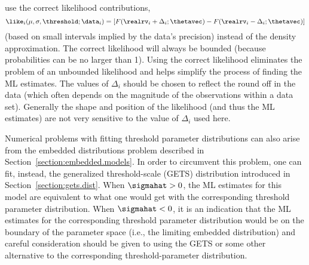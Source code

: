 use the correct likelihood contributions, 
\begin{equation}
\like_{i}(\mu, \sigma,\threshold;\data_{i})
=[F(\realrv_{i}+\Delta_{i};\thetavec)-
        F(\realrv_{i}-\Delta_{i};\thetavec)]
\label{equation:threshold.interval.likelihood}
\end{equation}
(based on small intervals implied by the data's precision) instead of
the density approximation.  The correct likelihood will always be
bounded (because probabilities can be no larger than 1). Using the correct
likelihood eliminates the problem of an unbounded likelihood and helps
simplify the
process of finding the ML estimates. The values
of $\Delta_{i}$ should be chosen to reflect the round off in the data
(which often depends on the magnitude of the observations within a
data set). Generally the shape and position of the likelihood (and
thus the ML estimates) are not very 
sensitive to the value of $\Delta_{i}$ used here.

Numerical problems with fitting threshold parameter distributions can
also arise from the embedded distributions problem described in
Section~\ref{section:embedded.models}. In order to circumvent this
problem, one can fit, instead, the generalized threshold-scale (GETS)
distribution introduced in Section~\ref{section:gets.dist}.  When
$\sigmahat>0$, the ML estimates for this model are equivalent to what
one would get with the corresponding threshold parameter distribution.
When $\sigmahat < 0$, it is an indication that the ML estimates for
the corresponding threshold parameter distribution would be on the
boundary of the parameter space (i.e., the limiting embedded
distribution) and careful consideration should be given to using the
GETS or some other alternative to the corresponding
threshold-parameter distribution.

